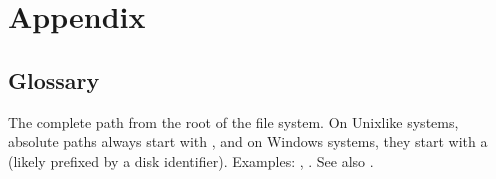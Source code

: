 \chapter{Appendix}
\cleardoublepage

\label{\detokenize{book_appendix:appendix}}\label{\detokenize{book_appendix::doc}}
\begin{figure}[tbp]
\centering

\noindent{}
\end{figure}

\sphinxstepscope


\section{Glossary}
\label{\detokenize{glossary:glossary}}\label{\detokenize{glossary:id1}}\label{\detokenize{glossary::doc}}\begin{description}
\ignorespaces 
\sphinxAtStartPar
The complete path from the root of the file system. On Unix\sphinxhyphen{}like systems, absolute paths always start with \sphinxcode{\sphinxupquote{/}}, and on Windows systems, they start with a \sphinxcode{\sphinxupquote{\textbackslash{}}} (likely prefixed by a disk identifier).
Examples: , . See also {\hyperref[\detokenize{glossary:term-relative-path}]{}}.


\end{description}
